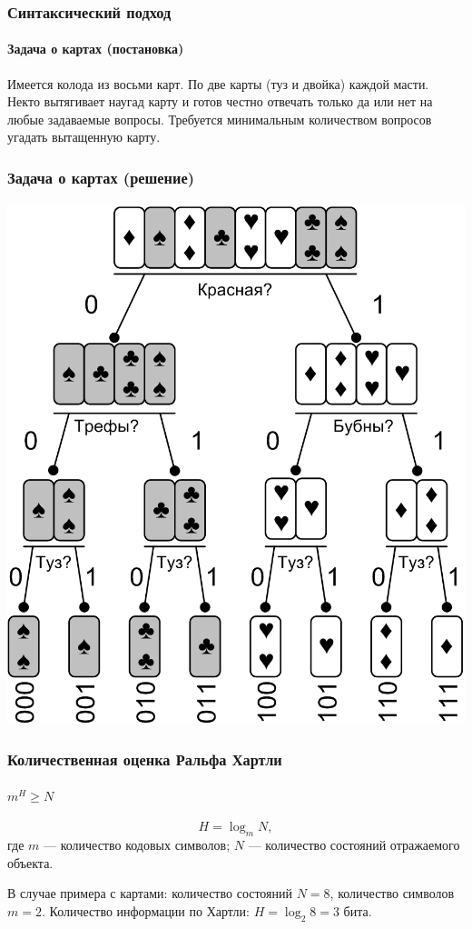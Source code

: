 \begin{frame}
    \frametitle{Синтаксический подход}
    \framesubtitle{Задача о картах (постановка)}
    
    \begin{example}
        Имеется колода из восьми карт. По две карты (туз и двойка) каждой масти. Некто вытягивает наугад карту и готов честно отвечать только да или нет на любые задаваемые вопросы. Требуется минимальным количеством вопросов угадать вытащенную карту.
    \end{example} 
\end{frame}

\begin{frame}
    \frametitle{Задача о картах (решение)}
    
    \begin{center}
        \includegraphics[width=.45\textwidth]{fig/cards} 
    \end{center} 
\end{frame}

\begin{frame}
    \frametitle{Количественная оценка Ральфа Хартли}
    \framesubtitle{$m^H\geq N$}
    
    \[
        H=\log_{m}N,
    \]
    где $m$ --- количество \alert{кодовых символов}; $N$ --- количество состояний \alert{отражаемого объекта}.

    \begin{example}
        В случае примера с картами: количество состояний $N=8$, количество символов $m=2$. Количество информации по Хартли: $H=\log_{2}8=3$ бита.
    \end{example}
\end{frame}


